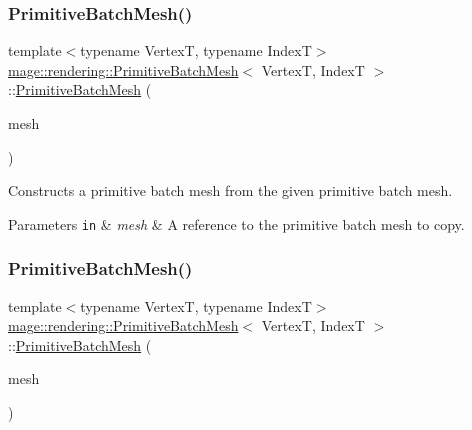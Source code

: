 \subsubsection{\texorpdfstring{Primitive\+Batch\+Mesh()}{PrimitiveBatchMesh()}\hspace{0.1cm}{\footnotesize\ttfamily [2/3]}}
{\footnotesize\ttfamily template$<$typename VertexT, typename IndexT$>$ \\
\mbox{\hyperlink{classmage_1_1rendering_1_1_primitive_batch_mesh}{mage\+::rendering\+::\+Primitive\+Batch\+Mesh}}$<$ VertexT, IndexT $>$\+::\mbox{\hyperlink{classmage_1_1rendering_1_1_primitive_batch_mesh}{Primitive\+Batch\+Mesh}} (\begin{DoxyParamCaption}\item[{const \mbox{\hyperlink{classmage_1_1rendering_1_1_primitive_batch_mesh}{Primitive\+Batch\+Mesh}}$<$ VertexT, IndexT $>$ \&}]{mesh }\end{DoxyParamCaption})\hspace{0.3cm}{\ttfamily [delete]}}

Constructs a primitive batch mesh from the given primitive batch mesh.


\begin{DoxyParams}[1]{Parameters}
\mbox{\tt in}  & {\em mesh} & A reference to the primitive batch mesh to copy. \\
\hline
\end{DoxyParams}
\mbox{\label{classmage_1_1rendering_1_1_primitive_batch_mesh_ac46a8538b295cf4d85c7309d2bb4cdd5}} 
\subsubsection{\texorpdfstring{Primitive\+Batch\+Mesh()}{PrimitiveBatchMesh()}\hspace{0.1cm}{\footnotesize\ttfamily [3/3]}}
{\footnotesize\ttfamily template$<$typename VertexT, typename IndexT$>$ \\
\mbox{\hyperlink{classmage_1_1rendering_1_1_primitive_batch_mesh}{mage\+::rendering\+::\+Primitive\+Batch\+Mesh}}$<$ VertexT, IndexT $>$\+::\mbox{\hyperlink{classmage_1_1rendering_1_1_primitive_batch_mesh}{Primitive\+Batch\+Mesh}} (\begin{DoxyParamCaption}\item[{\mbox{\hyperlink{classmage_1_1rendering_1_1_primitive_batch_mesh}{Primitive\+Batch\+Mesh}}$<$ VertexT, IndexT $>$ \&\&}]{mesh }\end{DoxyParamCaption})\hspace{0.3cm}{\ttfamily [noexcept]}}

